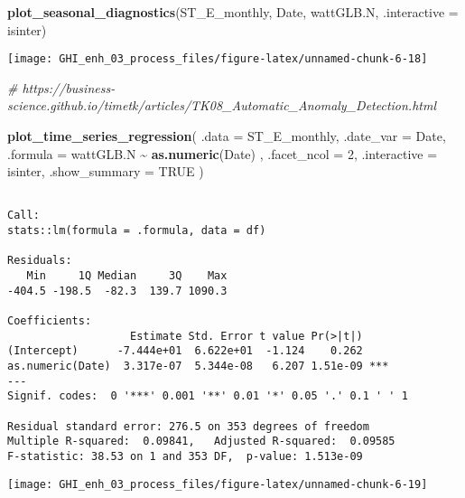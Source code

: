 \documentclass[
  10pt,
  a4paper,oneside]{article}
\newenvironment{Shaded}{\begin{snugshade}}{\end{snugshade}}
\newcommand{\AttributeTok}[1]{\textcolor[rgb]{0.13,0.29,0.53}{#1}}
\newcommand{\CommentTok}[1]{\textcolor[rgb]{0.56,0.35,0.01}{\textit{#1}}}
\newcommand{\ConstantTok}[1]{\textcolor[rgb]{0.56,0.35,0.01}{#1}}
\newcommand{\DecValTok}[1]{\textcolor[rgb]{0.00,0.00,0.81}{#1}}
\newcommand{\FunctionTok}[1]{\textcolor[rgb]{0.13,0.29,0.53}{\textbf{#1}}}
\newcommand{\NormalTok}[1]{#1}
\newcommand{\SpecialCharTok}[1]{\textcolor[rgb]{0.81,0.36,0.00}{\textbf{#1}}}
\begin{document}
\begin{Shaded}
\begin{Highlighting}[]
\FunctionTok{plot\_seasonal\_diagnostics}\NormalTok{(ST\_E\_monthly, Date, wattGLB.N, }\AttributeTok{.interactive =}\NormalTok{ isinter)}
\end{Highlighting}
\end{Shaded}

\begin{center}\texttt{[image: GHI\_enh\_03\_process\_files/figure-latex/unnamed-chunk-6-18]} \end{center}

\begin{Shaded}
\begin{Highlighting}[]
\CommentTok{\# https://business{-}science.github.io/timetk/articles/TK08\_Automatic\_Anomaly\_Detection.html}

\FunctionTok{plot\_time\_series\_regression}\NormalTok{(}
    \AttributeTok{.data         =}\NormalTok{ ST\_E\_monthly,}
    \AttributeTok{.date\_var     =}\NormalTok{ Date,}
    \AttributeTok{.formula      =}\NormalTok{ wattGLB.N }\SpecialCharTok{\textasciitilde{}} \FunctionTok{as.numeric}\NormalTok{(Date)  ,}
    \AttributeTok{.facet\_ncol   =} \DecValTok{2}\NormalTok{,}
    \AttributeTok{.interactive  =}\NormalTok{ isinter,}
    \AttributeTok{.show\_summary =} \ConstantTok{TRUE}
\NormalTok{)}
\end{Highlighting}
\end{Shaded}

\begin{verbatim}

Call:
stats::lm(formula = .formula, data = df)

Residuals:
   Min     1Q Median     3Q    Max 
-404.5 -198.5  -82.3  139.7 1090.3 

Coefficients:
                   Estimate Std. Error t value Pr(>|t|)    
(Intercept)      -7.444e+01  6.622e+01  -1.124    0.262    
as.numeric(Date)  3.317e-07  5.344e-08   6.207 1.51e-09 ***
---
Signif. codes:  0 '***' 0.001 '**' 0.01 '*' 0.05 '.' 0.1 ' ' 1

Residual standard error: 276.5 on 353 degrees of freedom
Multiple R-squared:  0.09841,   Adjusted R-squared:  0.09585 
F-statistic: 38.53 on 1 and 353 DF,  p-value: 1.513e-09
\end{verbatim}

\begin{center}\texttt{[image: GHI\_enh\_03\_process\_files/figure-latex/unnamed-chunk-6-19]} \end{center}
\end{document}
